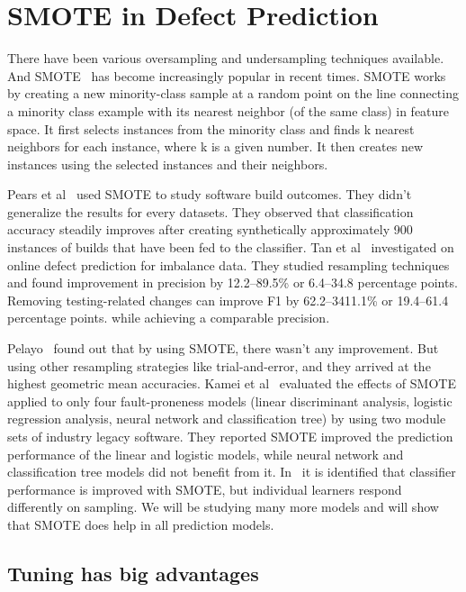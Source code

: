 \documentclass[conference]{IEEEtran}
\begin{document}
\section{SMOTE in Defect Prediction}
\label{smote}
There have been various oversampling and undersampling techniques available. And SMOTE~\cite{chawla2002smote} has become increasingly popular in recent times. SMOTE works by creating a new minority-class sample at a random point on the line connecting a minority class example with its nearest neighbor (of the same class) in feature space. It first selects instances from the minority class and finds k nearest neighbors for each instance, where k is a given number. It then creates new instances using the selected instances and their neighbors. 

Pears et al~\cite{pears2014synthetic} used SMOTE to study software build outcomes. They didn't generalize the results for every datasets. They observed
that classification accuracy steadily improves after creating synthetically approximately 900 instances of builds that have been fed to the classifier. Tan et al~\cite{tan2015online} investigated on online defect prediction for imbalance data. They studied resampling techniques and found improvement in precision by 12.2–89.5\% or 6.4–34.8 percentage points. Removing testing-related changes can improve F1 by 62.2–3411.1\% or 19.4–61.4 percentage points. while achieving a comparable precision.

Pelayo~\cite{pelayo2007applying} found out that by using SMOTE, there wasn't any improvement. But using other resampling strategies like trial-and-error, and they arrived at the highest geometric mean accuracies. Kamei et al~\cite{kamei2007effects} evaluated the effects of SMOTE applied to only four fault-proneness models
(linear discriminant analysis, logistic regression
analysis, neural network and classification tree) by
using two module sets of industry legacy software. They reported SMOTE improved the prediction performance of the linear and logistic models, while neural network and classification tree models did not
benefit from it. In~\cite{van2007experimental} it is identified that classifier performance is improved with SMOTE, but individual learners respond differently on sampling. We will be studying many more models and will show that SMOTE does help in all prediction models.

\subsection{Tuning has big advantages}
\label{sect:tune}
\end{document}
